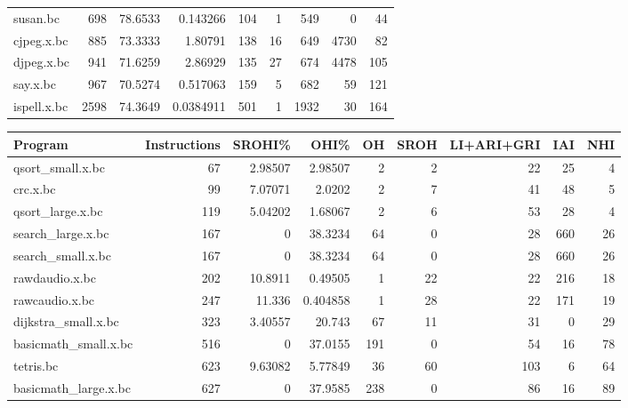 \begin{tabular}{lrrrrrrrr}
 susan.bc             &      698 & 78.6533  &  0.143266  &  104 &    1 &    549 &     0 &    44 \\
 cjpeg.x.bc           &      885 & 73.3333  &  1.80791   &  138 &   16 &    649 &  4730 &    82 \\
 djpeg.x.bc           &      941 & 71.6259  &  2.86929   &  135 &   27 &    674 &  4478 &   105 \\
 say.x.bc             &      967 & 70.5274  &  0.517063  &  159 &    5 &    682 &    59 &   121 \\
 ispell.x.bc          &     2598 & 74.3649  &  0.0384911 &  501 &    1 &   1932 &    30 &   164 \\
\hline
\end{tabular}\begin{tabular}{lrrrrrrrr}
\hline
 Program              &   Instructions &   SROHI\% &       OHI\% &   OH &   SROH &   LI+ARI+GRI &   IAI &   NHI \\
\hline
 qsort\_small.x.bc     &             67 &  2.98507 &  2.98507   &    2 &      2 &           22 &    25 &     4 \\
 crc.x.bc             &             99 &  7.07071 &  2.0202    &    2 &      7 &           41 &    48 &     5 \\
 qsort\_large.x.bc     &            119 &  5.04202 &  1.68067   &    2 &      6 &           53 &    28 &     4 \\
 search\_large.x.bc    &            167 &  0       & 38.3234    &   64 &      0 &           28 &   660 &    26 \\
 search\_small.x.bc    &            167 &  0       & 38.3234    &   64 &      0 &           28 &   660 &    26 \\
 rawdaudio.x.bc       &            202 & 10.8911  &  0.49505   &    1 &     22 &           22 &   216 &    18 \\
 rawcaudio.x.bc       &            247 & 11.336   &  0.404858  &    1 &     28 &           22 &   171 &    19 \\
 dijkstra\_small.x.bc  &            323 &  3.40557 & 20.743     &   67 &     11 &           31 &     0 &    29 \\
 basicmath\_small.x.bc &            516 &  0       & 37.0155    &  191 &      0 &           54 &    16 &    78 \\
 tetris.bc            &            623 &  9.63082 &  5.77849   &   36 &     60 &          103 &     6 &    64 \\
 basicmath\_large.x.bc &            627 &  0       & 37.9585    &  238 &      0 &           86 &    16 &    89 \\

\end{tabular}
